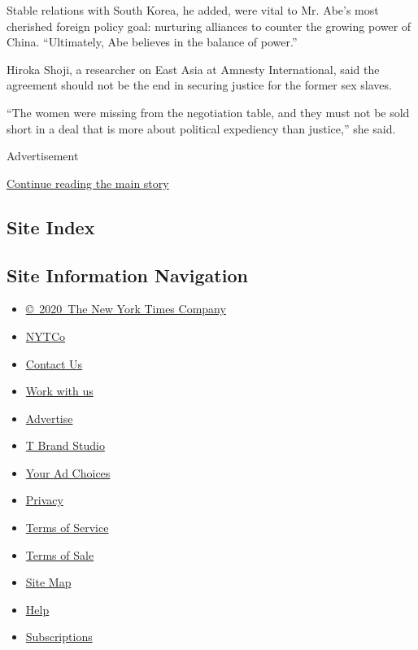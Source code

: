 Stable relations with South Korea, he added, were vital to Mr. Abe's
most cherished foreign policy goal: nurturing alliances to counter the
growing power of China. ``Ultimately, Abe believes in the balance of
power.''

Hiroka Shoji, a researcher on East Asia at Amnesty International, said
the agreement should not be the end in securing justice for the former
sex slaves.

``The women were missing from the negotiation table, and they must not
be sold short in a deal that is more about political expediency than
justice,'' she said.

Advertisement

\protect\hyperlink{after-bottom}{Continue reading the main story}

\hypertarget{site-index}{%
\subsection{Site Index}\label{site-index}}

\hypertarget{site-information-navigation}{%
\subsection{Site Information
Navigation}\label{site-information-navigation}}

\begin{itemize}
\tightlist
\item
  \href{https://help.nytimes3xbfgragh.onion/hc/en-us/articles/115014792127-Copyright-notice}{©~2020~The
  New York Times Company}
\end{itemize}

\begin{itemize}
\tightlist
\item
  \href{https://www.nytco.com/}{NYTCo}
\item
  \href{https://help.nytimes3xbfgragh.onion/hc/en-us/articles/115015385887-Contact-Us}{Contact
  Us}
\item
  \href{https://www.nytco.com/careers/}{Work with us}
\item
  \href{https://nytmediakit.com/}{Advertise}
\item
  \href{http://www.tbrandstudio.com/}{T Brand Studio}
\item
  \href{https://www.nytimes3xbfgragh.onion/privacy/cookie-policy\#how-do-i-manage-trackers}{Your
  Ad Choices}
\item
  \href{https://www.nytimes3xbfgragh.onion/privacy}{Privacy}
\item
  \href{https://help.nytimes3xbfgragh.onion/hc/en-us/articles/115014893428-Terms-of-service}{Terms
  of Service}
\item
  \href{https://help.nytimes3xbfgragh.onion/hc/en-us/articles/115014893968-Terms-of-sale}{Terms
  of Sale}
\item
  \href{https://spiderbites.nytimes3xbfgragh.onion}{Site Map}
\item
  \href{https://help.nytimes3xbfgragh.onion/hc/en-us}{Help}
\item
  \href{https://www.nytimes3xbfgragh.onion/subscription?campaignId=37WXW}{Subscriptions}
\end{itemize}
